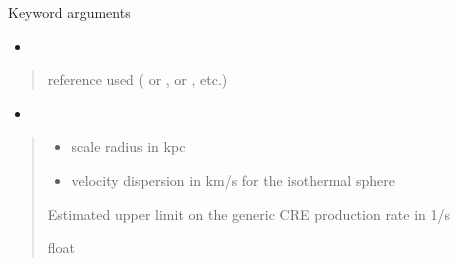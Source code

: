 \documentclass[letterpaper,10pt,english]{sphinxmanual}
\begin{document}
\begin{fulllineitems}
\begin{quote}
\begin{description}
\end{description}\end{quote}

\sphinxAtStartPar
Keyword arguments
\begin{itemize}
\item {} 
\sphinxAtStartPar
{}

\end{itemize}
\begin{quote}\begin{description}
\sphinxAtStartPar
{} \textendash{} reference used ( or \sphinxcode{\sphinxupquote{\textquotesingle{}1309.2641\textquotesingle{}}},  or \sphinxcode{\sphinxupquote{\textquotesingle{}1408.0002\textquotesingle{}}}, etc.)

\end{description}\end{quote}
\begin{itemize}
\item {} 
\sphinxAtStartPar
{}

\end{itemize}
\begin{quote}\begin{description}
\begin{itemize}
\item {} 
\sphinxAtStartPar
{} \textendash{} scale radius in kpc

\item {} 
\sphinxAtStartPar
{} \textendash{} velocity dispersion in km/s for the isothermal sphere {\hyperref[\detokenize{diffsph.profiles:diffsph.profiles.templates.sis}]{}}

\end{itemize}

\sphinxAtStartPar
Estimated upper limit on the generic CRE production rate in 1/s

\sphinxAtStartPar
float

\end{description}\end{quote}

\end{fulllineitems}
\end{document}
